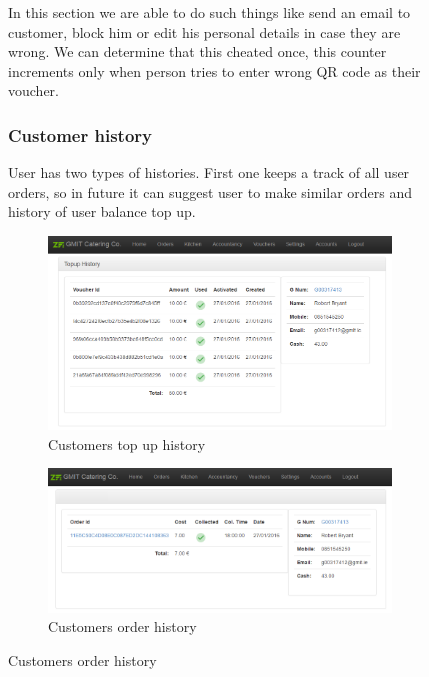\begin{figure}
		In this section we are able to do such things like send an email to customer, block him or edit his personal details in case they are wrong. We can determine that this cheated once, this counter increments only when person tries to enter wrong QR code as their voucher. 
		
		\subsubsection{Customer history}
		User has two types of histories. First one keeps a track of all user orders, so in future it can suggest user to make similar orders and history of user balance top up.
		
		
		\begin{figure}[H]
			\centering
			\includegraphics[width=1\textwidth]{img/zf2/02-customer_information_topup_history.png}
			\caption{Customers top up history}
			\label{fig:customer-topup-history}
		\end{figure}
		
		\begin{figure}[H]
			\centering
			\includegraphics[width=1\textwidth]{img/zf2/02-customer_information_order_history.png}
			\caption{Customers order history}
			\label{fig:customer-order-history}
		\end{figure}
		

\end{figure}
